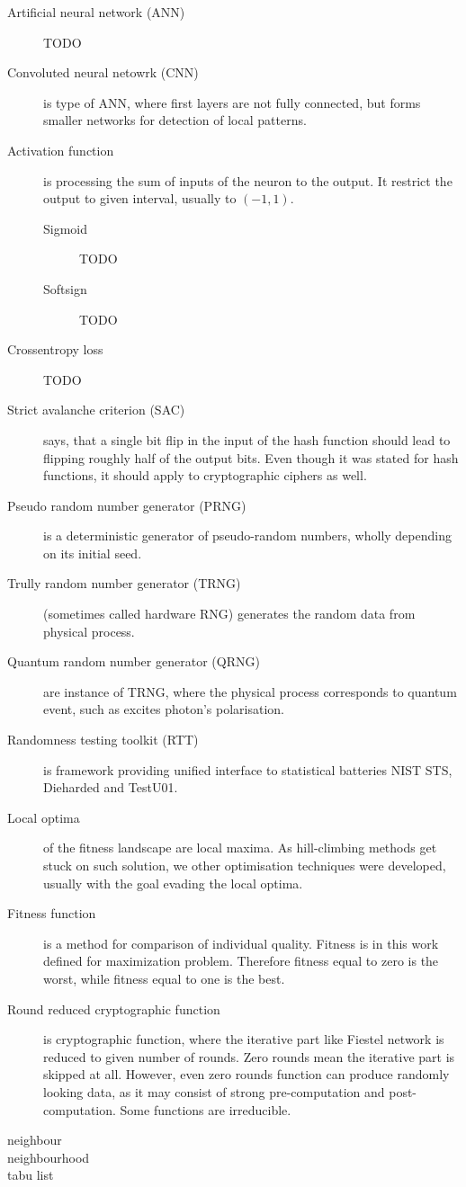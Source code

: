 \documentclass[
  print, %
  Table,   %
  nolof,     %
  nolot,     %
  11pt, %
  oneside  %
]{fithesis3}
\begin{document}
\begin{description}
    \item[Artificial neural network (ANN)] TODO
    \item[Convoluted neural netowrk (CNN)] is type of ANN, where first layers are not fully connected, but forms smaller networks for detection of local patterns.
    \item[Activation function] is processing the sum of inputs of the neuron to the output. It restrict the output to given interval, usually to $(-1, 1)$.
    \begin{description}
        \item[Sigmoid] TODO
        \item[Softsign] TODO
    \end{description}
    \item[Crossentropy loss] TODO

    \item[Strict avalanche criterion (SAC)] says, that a single bit flip in the input of the hash function should lead to flipping roughly half of the output bits. Even though it was stated for hash functions, it should apply to cryptographic ciphers as well.
    \item[Pseudo random number generator (PRNG)] is a deterministic generator of pseudo-random numbers, wholly depending on its initial seed.
    \item[Trully random number generator (TRNG)] (sometimes called hardware RNG) generates the random data from physical process.
    \item[Quantum random number generator (QRNG)] are instance of TRNG, where the physical process corresponds to quantum event, such as excites photon's polarisation.
    \item[Randomness testing toolkit (RTT)] is framework providing unified interface to statistical batteries NIST STS, Dieharded and TestU01.
    \item[Local optima] of the fitness landscape are local maxima. As hill-climbing methods get stuck on such solution, we other optimisation techniques were developed, usually with the goal evading the local optima.
    \item[Fitness function] is a method for comparison of individual quality. Fitness is in this work defined for maximization problem. Therefore fitness equal to zero is the worst, while fitness equal to one is the best.
    \item[Round reduced cryptographic function] is cryptographic function, where the iterative part like Fiestel network is reduced to given number of rounds. Zero rounds mean the iterative part is skipped at all. However, even zero rounds function can produce randomly looking data, as it may consist of strong pre-computation and post-computation. Some functions are irreducible.
    \item[neighbour]
    \item[neighbourhood]
    \item[tabu list]
\end{description}
\end{document}
